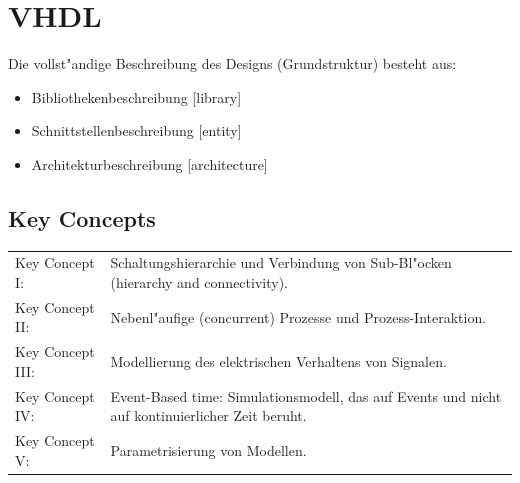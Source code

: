 \section{VHDL}
	Die vollst"andige Beschreibung des Designs (Grundstruktur) besteht aus:
	\begin{itemize}
	\setlength{\itemsep}{0pt}
  	\setlength{\parskip}{0pt}
  	\setlength{\parsep}{0pt}
		\item Bibliothekenbeschreibung [library]
		\item Schnittstellenbeschreibung [entity]
		\item Architekturbeschreibung [architecture]
	\end{itemize}

	\subsection{Key Concepts}
		\begin{tabular}{ll}
			Key Concept I: & Schaltungshierarchie und Verbindung von Sub-Bl"ocken 
				(hierarchy and connectivity).\\
			Key Concept II: & Nebenl"aufige (concurrent) Prozesse und Prozess-Interaktion.\\
			Key Concept III: & Modellierung des elektrischen Verhaltens von Signalen.\\
			Key Concept IV: & Event-Based time: Simulationsmodell, das auf Events und nicht 
				auf kontinuierlicher Zeit beruht.\\
			Key Concept V: & Parametrisierung von Modellen.
		\end{tabular}

